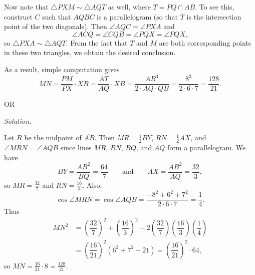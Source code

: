 \documentclass[10pt]{article}
\newcommand{\solution}
{
\vspace{5pt}
\noindent\textit{Solution.}\qquad
}
\begin{document}
\begin{enumerate}
\par Now note that $\triangle PXM\sim\triangle AQT$ as well, where $T=PQ\cap AB$.  To see this, construct $C$ such that $AQBC$ is a parallelogram (so that $T$ is the intersection point of the two diagonals).  Then $\angle AQC=\angle PXA$ and \[\angle ACQ=\angle CQB=\angle PQX=\angle PQX,\] so $\triangle PXA\sim\triangle AQT$.  From the fact that $T$ and $M$ are both corresponding points in these two triangles, we obtain the desired conclusion.

\par As a result, simple computation gives \[MN = \dfrac{PM}{PX}\cdot XB = \dfrac{AT}{AQ}\cdot XB = \dfrac{AB^3}{2\cdot AQ\cdot QB} = \dfrac{8^3}{2\cdot 6\cdot 7} = \boxed{\dfrac{128}{21}}.\]

\begin{center}OR\end{center}

\solution
Let $R$ be the midpoint of $\overline{AB}$.  Then $MR=\frac12BY$, $RN=\frac12AX$, and $\angle MRN=\angle AQB$ since lines $MR$, $RN$, $BQ$, and $AQ$ form a parallelogram.  We have \[BY=\frac{AB^2}{BQ}=\frac{64}7\qquad\text{and}\qquad AX=\frac{AB^2}{AQ}=\frac{32}3,\] so $MR=\frac{32}7$ and $RN=\frac{16}3$.  Also, \[\cos\angle MRN = \cos\angle AQB = \dfrac{-8^2+6^2+7^2}{2\cdot 6\cdot 7} = \dfrac14.\] Thus \begin{align*}MN^2 &= \left(\dfrac{32}7\right)^2 + \left(\dfrac{16}3\right)^2 - 2\left(\dfrac{32}7\right)\left(\dfrac{16}3\right)\left(\dfrac14\right)\\&=\left(\dfrac{16}{21}\right)^2\left(6^2+7^2 - 21\right) = \left(\dfrac{16}{21}\right)^2\cdot 64,\end{align*} so $MN=\tfrac{16}{21}\cdot 8 = \boxed{\tfrac{128}{21}}$.

    
\end{enumerate}
\end{document}

